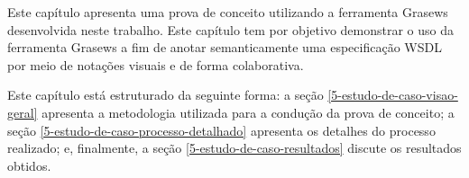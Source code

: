 Este capítulo apresenta uma prova de conceito utilizando a ferramenta Grasews desenvolvida neste trabalho. Este capítulo tem por objetivo demonstrar o uso da ferramenta Grasews a fim de anotar semanticamente uma especificação WSDL por meio de notações visuais e de forma colaborativa.

Este capítulo está estruturado da seguinte forma: a seção \ref{5-estudo-de-caso-visao-geral} apresenta a metodologia utilizada para a condução da prova de conceito; a seção \ref{5-estudo-de-caso-processo-detalhado} apresenta os detalhes do processo realizado; e, finalmente, a seção \ref{5-estudo-de-caso-resultados} discute os resultados obtidos.